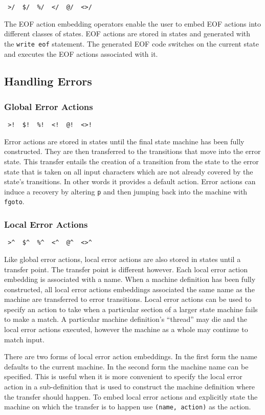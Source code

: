 \documentclass[letterpaper,11pt,oneside]{book}
\newcommand{\verbspace}{\vspace{10pt}}
\begin{document}
\verb| >/  $/  %/  </  @/  <>/ | 
\verbspace

The EOF action embedding operators enable the user to embed EOF actions into
different classes of
states.  EOF actions are stored in states and generated with the \verb|write eof|
statement. The generated EOF code switches on the current state and executes the EOF
actions associated with it.

\subsection{Handling Errors}

\subsubsection{Global Error Actions}

\verb| >!  $!  %!  <!  @!  <>! | 
\verbspace

Error actions are stored in states until the final state machine has been fully
constructed. They are then transferred to the transitions that move into the
error state. This transfer entails the creation of a transition from the state
to the error state that is taken on all input characters which are not already
covered by the state's transitions. In other words it provides a default
action. Error actions can induce a recovery by altering \verb|p| and then jumping back
into the machine with \verb|fgoto|.

\subsubsection{Local Error Actions}

\verb| >^  $^  %^  <^  @^  <>^ | 
\verbspace

Like global error actions, local error actions are also stored in states until
a transfer point. The transfer point is different however. Each local error action
embedding is associated with a name. When a machine definition has been fully
constructed, all local error actions embeddings associated the same name as the
machine are transferred to error transitions. Local error actions can be used
to specify an action to take when a particular section of a larger state
machine fails to make a match. A particular machine definition's ``thread'' may
die and the local error actions executed, however the machine as a whole may
continue to match input.

There are two forms of local error action embeddings. In the first form the name defaults
to the current machine. In the second form the machine name can be specified.  This
is useful when it is more convenient to specify the local error action in a
sub-definition that is used to construct the machine definition where the
transfer should happen. To embed local error actions and explicitly state the
machine on which the transfer is to happen use \verb|(name, action)| as the
action.
\end{document}
